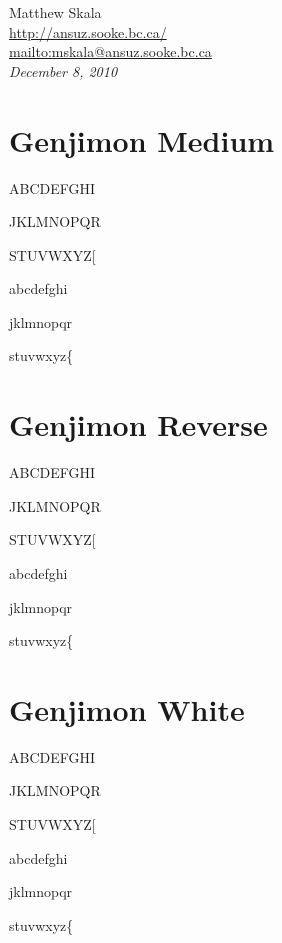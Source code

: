 \documentclass[12pt]{article}
\begin{document}
\vspace{\baselineskip}

\noindent Matthew Skala\\
\url{http://ansuz.sooke.bc.ca/}\\
\url{mailto:mskala@ansuz.sooke.bc.ca}\\
\textit{December 8, 2010}

\clearpage

\setlength{\parindent}{0pt}
\setlength{\parskip}{\baselineskip}


\section{Genjimon Medium}

{
ABCDEFGHI

JKLMNOPQR

STUVWXYZ[

abcdefghi

jklmnopqr

stuvwxyz\{}

\clearpage


\section{Genjimon Reverse}

{
ABCDEFGHI

JKLMNOPQR

STUVWXYZ[

abcdefghi

jklmnopqr

stuvwxyz\{}

\clearpage


\section{Genjimon White}

{
ABCDEFGHI

JKLMNOPQR

STUVWXYZ[

abcdefghi

jklmnopqr

stuvwxyz\{}
\end{document}
